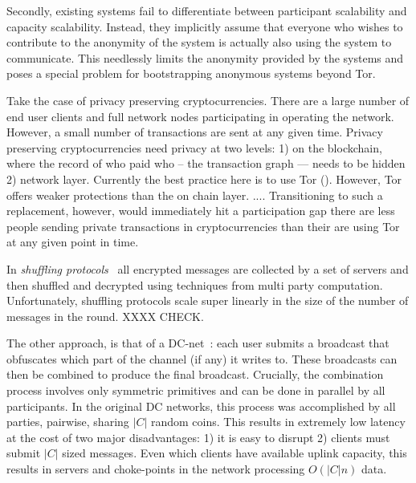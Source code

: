 Secondly, existing systems fail to differentiate between participant scalability and capacity scalability.  Instead, they implicitly assume that everyone who wishes to contribute to the anonymity of the system is actually also using the system to communicate. This needlessly limits the anonymity provided by the systems and poses a special problem for bootstrapping anonymous systems beyond Tor.

Take the case of privacy preserving cryptocurrencies. There are a large number of end user clients and full network nodes participating in operating the network. However, a small number of transactions are sent at any given time.
Privacy preserving cryptocurrencies need privacy at two levels: 1) on the blockchain, where the record of who paid who -- the transaction graph --- needs to be hidden  2) network layer.  Currently the best practice here is to use Tor (). However, Tor offers weaker protections than the on chain layer. .... Transitioning to such a replacement, however, would immediately hit a participation gap there are less people sending private transactions in cryptocurrencies than their are using Tor at any given point in time. 

In \emph{shuffling protocols}~\cite{CCS:LYKGKM19,USENIX:AKTZ17} all encrypted messages are collected by a set of servers and then shuffled and decrypted using techniques from multi party computation. Unfortunately, shuffling protocols scale super linearly in the size of the number of messages in the round.  XXXX CHECK. 




The other approach, is that of a DC-net~\cite{JC:Chaum88}: each user submits a broadcast that obfuscates which part of the channel (if any) it writes to.  These broadcasts can then be combined to produce the final broadcast. Crucially, the combination process involves only symmetric primitives and can be done in parallel by all participants. In the original DC networks, this process was accomplished  by all parties, pairwise, sharing $|C|$ random coins.
This results in extremely low latency at the cost of two major disadvantages: 1) it is easy to disrupt 2) clients must submit $|C|$ sized messages. Even which clients have available uplink capacity, this results in servers and choke-points in the network processing $O(|C|n)$ data.



